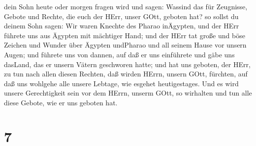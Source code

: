dein Sohn heute oder morgen fragen wird und sagen: Wassind das für
Zeugnisse, Gebote und Rechte, die euch der HErr, unser GOtt, geboten
hat?  so sollst du deinem Sohn sagen: Wir waren Knechte des
Pharao inÄgypten, und der HErr führete uns aus Ägypten mit mächtiger
Hand;  und der HErr tat große und böse Zeichen und Wunder
über Ägypten undPharao und all seinem Hause vor unsern Augen;
 und führete uns von dannen, auf daß er uns einführete und
gäbe uns dasLand, das er unsern Vätern geschworen hatte; 
und hat uns geboten, der HErr, zu tun nach allen diesen Rechten, daß
wirden HErrn, unsern GOtt, fürchten, auf daß uns wohlgehe alle unsere
Lebtage, wie esgehet heutigestages.  Und es wird unsere
Gerechtigkeit sein vor dem HErrn, unserm GOtt, so wirhalten und tun alle
diese Gebote, wie er uns geboten hat.

\hypertarget{section-6}{%
\section{7}\label{section-6}}

